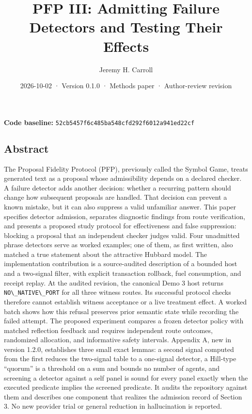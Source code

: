 \documentclass[
  11pt,
]{article}
\title{PFP III: Admitting Failure Detectors and Testing Their Effects}
\author{Jeremy H. Carroll}
\date{2026-10-02 · Version 0.1.0 · Methods paper · Author-review
revision}
\newcommand{\passthrough}[1]{#1}
\begin{document}
\makeatletter
\begin{center}
{\LARGE \@title\par}
\vspace{0.8em}
{\normalsize \@author\par}
\vspace{0.5em}
{\small \@date\par}
\end{center}
\makeatother

\textbf{Code baseline:}
\nolinkurl{52cb5457f6c485ba548cfd292f6012a941ed22cf}

\subsection{Abstract}\label{abstract}

The Proposal Fidelity Protocol (PFP), previously called the Symbol Game,
treats generated text as a proposal whose admissibility depends on a
declared checker. A failure detector adds another decision: whether a
recurring pattern should change how subsequent proposals are handled.
That decision can prevent a known mistake, but it can also suppress a
valid unfamiliar answer. This paper specifies detector admission,
separates diagnostic findings from route verification, and presents a
proposed study protocol for effectiveness and false suppression:
blocking a proposal that an independent checker judges valid. Four
unadmitted phrase detectors serve as worked examples; one of them, as
first written, also matched a true statement about the attractive
Hubbard model. The implementation contribution is a source-audited
description of a bounded host and a two-signal filter, with explicit
transaction rollback, fuel consumption, and receipt replay. At the
audited revision, the canonical Demo 3 host returns
\passthrough{\lstinline!NO\_NATIVE\_PORT!} for all three witness routes.
Its successful protocol checks therefore cannot establish witness
acceptance or a live treatment effect. A worked batch shows how this
refusal preserves prior semantic state while recording the failed
attempt. The proposed experiment compares a frozen detector policy with
matched reflection feedback and requires independent route outcomes,
randomized allocation, and informative safety intervals. Appendix A, new
in version 1.2.0, establishes three small exact lemmas: a second signal
computed from the first reduces the two-signal table to a one-signal
detector, a Hill-type ``quorum'' is a threshold on a sum and bounds no
number of agents, and screening a detector against a self panel is sound
for every panel exactly when the executed predicate implies the screened
predicate. It audits the repository against them and describes one
component that realizes the admission record of Section 3. No new
provider trial or general reduction in hallucination is reported.
\end{document}
